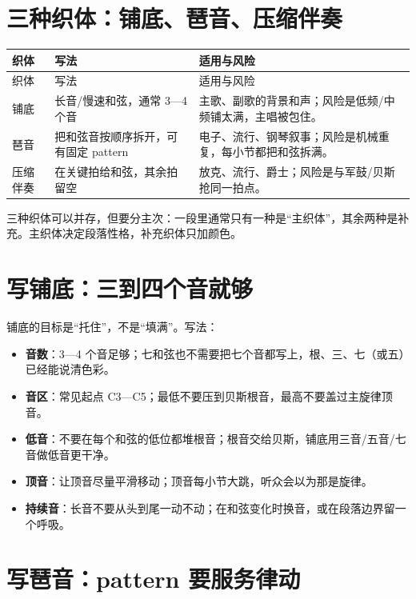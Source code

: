 \section{三种织体：铺底、琶音、压缩伴奏}
\label{sec:textures}

\begin{longtable}{p{}p{}p{}}
\toprule
织体 & 写法 & 适用与风险 \\
\midrule
\endfirsthead
\toprule
织体 & 写法 & 适用与风险 \\
\midrule
\endhead
铺底 & 长音/慢速和弦，通常 3—4 个音 & 主歌、副歌的背景和声；风险是低频/中频铺太满，主唱被包住。 \\
琶音 & 把和弦音按顺序拆开，可有固定 pattern & 电子、流行、钢琴叙事；风险是机械重复，每小节都把和弦拆满。 \\
压缩伴奏 & 在关键拍给和弦，其余拍留空 & 放克、流行、爵士；风险是与军鼓/贝斯抢同一拍点。 \\
\bottomrule
\end{longtable}

三种织体可以并存，但要分主次：一段里通常只有一种是“主织体”，其余两种是补充。主织体决定段落性格，补充织体只加颜色。

\section{写铺底：三到四个音就够}
\label{sec:pad}

铺底的目标是“托住”，不是“填满”。写法：

\begin{itemize}
\item \textbf{音数}：3—4 个音足够；七和弦也不需要把七个音都写上，根、三、七（或五）已经能说清色彩。
\item \textbf{音区}：常见起点 C3—C5；最低不要压到贝斯根音，最高不要盖过主旋律顶音。
\item \textbf{低音}：不要在每个和弦的低位都堆根音；根音交给贝斯，铺底用三音/五音/七音做低音更干净。
\item \textbf{顶音}：让顶音尽量平滑移动；顶音每小节大跳，听众会以为那是旋律。
\item \textbf{持续音}：长音不要从头到尾一动不动；在和弦变化时换音，或在段落边界留一个呼吸。
\end{itemize}

\section{写琶音：pattern 要服务律动}
\label{sec:arpeggio}

